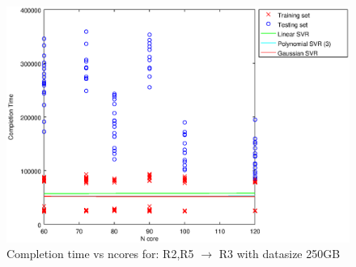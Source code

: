 
\begin {figure}[hbtp]
\centering
\includegraphics[width=\textwidth]{output/R2_R5_VS_R3_250_ALL_FEATURES/plot_R2_R5_VS_R3_250_bestmodels.eps}
\caption{Completion time vs ncores for: R2,R5 $\rightarrow$ R3 with datasize 250GB}
\label{fig:coreonly_linear_R2,R5_R3_250}
\end {figure}
